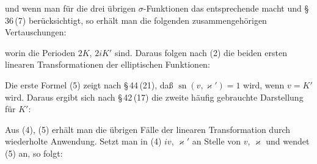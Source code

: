 
und wenn man für die drei übrigen $\sigma$-Funktionen das entsprechende macht und \S\,36\,(7) berücksichtigt, so erhält man die folgenden zusammengehörigen Vertauschungen:


worin die Perioden $2K$, $2iK'$ sind. Daraus folgen nach (2) die beiden ersten linearen Transformationen der elliptischen Funktionen:



Die erste Formel (5) zeigt nach \S\,44\,(21), daß $\operatorname{sn}(v,\varkappa')=1$ wird, wenn $v=K'$ wird. Daraus ergibt sich nach \S\,42\,(17) die zweite häufig gebrauchte Darstellung für $K'$:


Aus (4), (5) erhält man die übrigen Fälle der linearen Transformation durch wiederholte Anwendung. Setzt man in (4) $iv$, $\varkappa'$ an Stelle von $v$, $\varkappa$ und wendet (5) an, so folgt:

